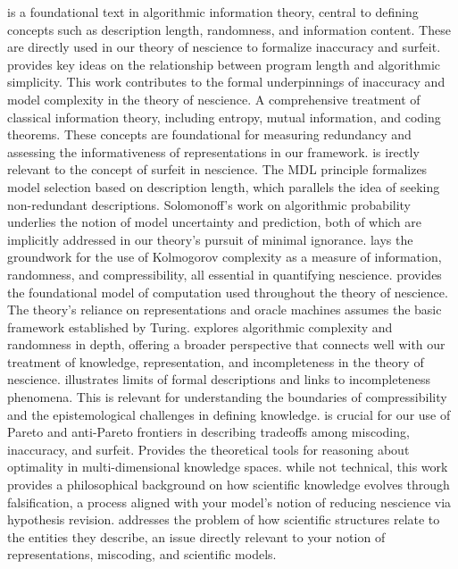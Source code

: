 \cite{li2013introduction} is a foundational text in algorithmic information theory, central to defining concepts such as description length, randomness, and information content. These are directly used in our theory of nescience to formalize inaccuracy and surfeit. \cite{chaitin1969simplicity} provides key ideas on the relationship between program length and algorithmic simplicity. This work contributes to the formal underpinnings of inaccuracy and model complexity in the theory of nescience. \cite{cover2012elements} A comprehensive treatment of classical information theory, including entropy, mutual information, and coding theorems. These concepts are foundational for measuring redundancy and assessing the informativeness of representations in our framework. \cite{grunwald2007minimum} is irectly relevant to the concept of surfeit in nescience. The MDL principle formalizes model selection based on description length, which parallels the idea of seeking non-redundant descriptions. \cite{solomonoff1964formal} Solomonoff's work on algorithmic probability underlies the notion of model uncertainty and prediction, both of which are implicitly addressed in our theory's pursuit of minimal ignorance. \cite{kolmogorov1965three} lays the groundwork for the use of Kolmogorov complexity as a measure of information, randomness, and compressibility, all essential in quantifying nescience. \cite{turing1936computable} provides the foundational model of computation used throughout the theory of nescience. The theory's reliance on representations and oracle machines assumes the basic framework established by Turing. \cite{calude2002information} explores algorithmic complexity and randomness in depth, offering a broader perspective that connects well with our treatment of knowledge, representation, and incompleteness in the theory of nescience. \cite{chaitin1995berry} illustrates limits of formal descriptions and links to incompleteness phenomena. This is relevant for understanding the boundaries of compressibility and the epistemological challenges in defining knowledge. \cite{miettinen2012nonlinear} is crucial for our use of Pareto and anti-Pareto frontiers in describing tradeoffs among miscoding, inaccuracy, and surfeit. Provides the theoretical tools for reasoning about optimality in multi-dimensional knowledge spaces. \cite{popper2014conjectures} while not technical, this work provides a philosophical background on how scientific knowledge evolves through falsification, a process aligned with your model's notion of reducing nescience via hypothesis revision. \cite{suppes2002representation} addresses the problem of how scientific structures relate to the entities they describe, an issue directly relevant to your notion of representations, miscoding, and scientific models.
